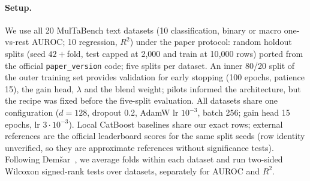\documentclass{article}
\begin{document}
\paragraph{Setup.}
We use all 20 MulTaBench text datasets (10 classification, binary or macro one-vs-rest AUROC; 10 regression, $R^2$) under the paper protocol: random holdout splits (seed $42+$fold, test capped at 2{,}000 and train at 10{,}000 rows) ported from the official \texttt{paper\_version} code; five splits per dataset.
An inner 80/20 split of the outer training set provides validation for early stopping (100 epochs, patience 15), the gain head, $\lambda$ and the blend weight; pilots informed the architecture, but the recipe was fixed before the five-split evaluation.
All datasets share one configuration ($d=128$, dropout 0.2, AdamW lr $10^{-3}$, batch 256; gain head 15 epochs, lr $3\cdot10^{-3}$).
Local CatBoost baselines share our exact rows; external references are the official leaderboard scores for the same split seeds (row identity unverified, so they are approximate references without significance tests).
Following Dem\v{s}ar~\cite{demsar2006statistical}, we average folds within each dataset and run two-sided Wilcoxon signed-rank tests over datasets, separately for AUROC and $R^2$.

\begin{table}[t]
\caption{Full-budget accuracy, dataset means (folds averaged per dataset).
W/T/L: datasets where the Blend wins, ties or loses against that row; $^{*}$: two-sided Wilcoxon $p<0.05$ (local rows only).
$^{\dagger n}$: reference for only $n$ datasets; [ ]: the Blend's mean on those $n$.}
\label{tab:main}
\centering
\footnotesize

\end{table}
\end{document}
